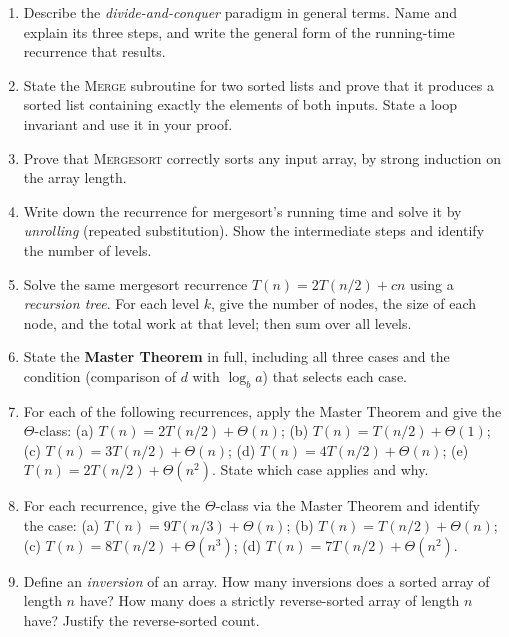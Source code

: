 \documentclass[11pt]{article}
\begin{document}
\begin{enumerate}[label=\textbf{A\arabic*.}, leftmargin=2.2em]

\item Describe the \emph{divide-and-conquer} paradigm in general terms. Name and explain
its three steps, and write the general form of the running-time recurrence that results.

\item State the \textsc{Merge} subroutine for two sorted lists and prove that it produces a
sorted list containing exactly the elements of both inputs. State a loop invariant and use
it in your proof.

\item Prove that \textsc{Mergesort} correctly sorts any input array, by strong induction on
the array length.

\item Write down the recurrence for mergesort's running time and solve it by
\emph{unrolling} (repeated substitution). Show the intermediate steps and identify the
number of levels.

\item Solve the same mergesort recurrence $T(n) = 2T(n/2) + cn$ using a \emph{recursion
tree}. For each level $k$, give the number of nodes, the size of each node, and the total
work at that level; then sum over all levels.

\item State the \textbf{Master Theorem} in full, including all three cases and the
condition (comparison of $d$ with $\log_b a$) that selects each case.

\item For each of the following recurrences, apply the Master Theorem and give the
$\Theta$-class: (a) $T(n) = 2T(n/2) + \Theta(n)$; (b) $T(n) = T(n/2) + \Theta(1)$; (c)
$T(n) = 3T(n/2) + \Theta(n)$; (d) $T(n) = 4T(n/2) + \Theta(n)$; (e) $T(n) = 2T(n/2) +
\Theta(n^2)$. State which case applies and why.

\item For each recurrence, give the $\Theta$-class via the Master Theorem and identify the
case: (a) $T(n) = 9T(n/3) + \Theta(n)$; (b) $T(n) = T(n/2) + \Theta(n)$; (c) $T(n) =
8T(n/2) + \Theta(n^3)$; (d) $T(n) = 7T(n/2) + \Theta(n^2)$.

\item Define an \emph{inversion} of an array. How many inversions does a sorted array of
length $n$ have? How many does a strictly reverse-sorted array of length $n$ have? Justify
the reverse-sorted count.


\end{enumerate}
\end{document}
